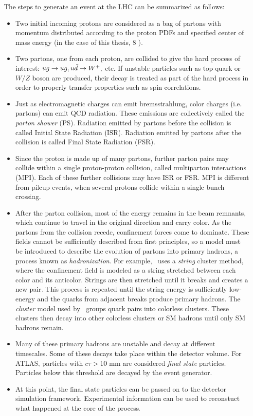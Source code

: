 The steps to generate an event at the LHC can be summarized as follows:
\begin{itemize}
\item Two initial incoming protons are considered as a bag of partons with momentum distributed according to the proton PDFs and specified center of mass energy (in the case of this thesis, 8 \tev).
\item Two partons, one from each proton, are collided to give the hard process of interest: $ug \rightarrow ug, u\bar{d}\rightarrow W^{+}$, etc. If unstable particles such as top quark or $W/Z$ boson are produced, their decay is treated as part of the hard process in order to properly transfer properties such as spin correlations.
\item Just as electromagnetic charges can emit bremsstrahlung, color charges (i.e. partons) can emit QCD radiation. These emissions are collectively called the \emph{parton shower} (PS). Radiation emitted by partons before the collision is called Initial State Radiation (ISR). Radiation emitted by partons after the collision is called Final State Radiation (FSR).  
\item Since the proton is made up of many partons, further parton pairs may collide within a single proton-proton collision, called multiparton interactions (MPI). Each of these further collisions may have ISR or FSR. MPI is different from pileup events, when several protons collide within a single bunch crossing. 
\item After the parton collision, most of the energy remains in the beam remnants, which continue to travel in the original direction and carry color. As the partons from the collision recede, confinement forces come to dominate. These fields cannot be sufficiently described from first principles, so a model must be introduced to describe the evolution of partons into primary hadrons, a process known as \emph{hadronization}. For example, \py\ uses a \emph{string} cluster method, where the confinement field is modeled as a string stretched between each color and its anticolor. Strings are then stretched until it breaks and creates a new pair. This process is repeated until the string energy is sufficiently low-energy and the quarks from adjacent breaks produce primary hadrons. The \emph{cluster} model used by \hw\ groups quark pairs into colorless clusters. These clusters then decay into other colorless clusters or SM hadrons until only SM hadrons remain.
\item Many of these primary hadrons are unstable and decay at different timescales. Some of these decays take place within the detector volume. For ATLAS, particles with $c\tau > 10$ mm are considered \emph{final state} particles. Particles below this threshold are decayed by the event generator. 
\item At this point, the final state particles can be passed on to the detector simulation framework. Experimental information can be used to reconstuct what happened at the core of the process.
\end{itemize}

